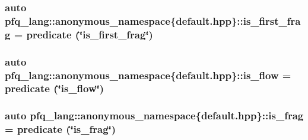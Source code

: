 \hypertarget{namespacepfq__lang_1_1anonymous__namespace_02default_8hpp_03_a235bc51b1c287765f0a4bd391ed089a9}{
\subsubsection[{is\+\_\+first\+\_\+frag}]{\setlength{\rightskip}{0pt plus 5cm}auto pfq\+\_\+lang\+::anonymous\+\_\+namespace\{default.\+hpp\}\+::is\+\_\+first\+\_\+frag = {\bf predicate} (\char`\"{}is\+\_\+first\+\_\+frag\char`\"{})}}\label{namespacepfq__lang_1_1anonymous__namespace_02default_8hpp_03_a235bc51b1c287765f0a4bd391ed089a9}
\hypertarget{namespacepfq__lang_1_1anonymous__namespace_02default_8hpp_03_a32aab6804e2daac2458f7c050ed69cf1}{
\subsubsection[{is\+\_\+flow}]{\setlength{\rightskip}{0pt plus 5cm}auto pfq\+\_\+lang\+::anonymous\+\_\+namespace\{default.\+hpp\}\+::is\+\_\+flow = {\bf predicate} (\char`\"{}is\+\_\+flow\char`\"{})}}\label{namespacepfq__lang_1_1anonymous__namespace_02default_8hpp_03_a32aab6804e2daac2458f7c050ed69cf1}
\hypertarget{namespacepfq__lang_1_1anonymous__namespace_02default_8hpp_03_a8fa70cc0ae09592136e8e04e60a98ab6}{
\subsubsection[{is\+\_\+frag}]{\setlength{\rightskip}{0pt plus 5cm}auto pfq\+\_\+lang\+::anonymous\+\_\+namespace\{default.\+hpp\}\+::is\+\_\+frag = {\bf predicate} (\char`\"{}is\+\_\+frag\char`\"{})}}\label{namespacepfq__lang_1_1anonymous__namespace_02default_8hpp_03_a8fa70cc0ae09592136e8e04e60a98ab6}
